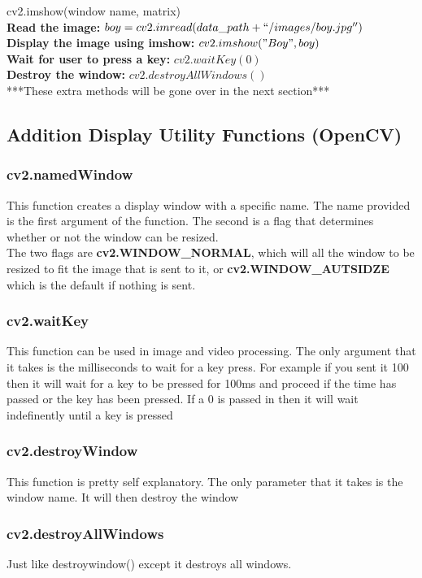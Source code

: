\documentclass[fleqn]{article}
\begin{document}
    \begin{center}
      cv2.imshow(window name, matrix)\\
      \textbf{Read the image:} $boy = cv2.imread(data\_path + ``/images/boy.jpg'')$\\
      \textbf{Display the image using imshow: } $cv2.imshow("Boy", boy)$\\
      \textbf{Wait for user to press a key: } $cv2.waitKey(0)$\\
      \textbf{Destroy the window: } $cv2.destroyAllWindows()$\\
      ***These extra methods will be gone over in the next section***
    \end{center}

    \subsection{Addition Display Utility Functions (OpenCV)}
    \subsubsection{cv2.namedWindow}
    This function creates a display window with a specific name. The name provided is the first argument of the function. The second is a flag that determines whether or not the window can be resized. \\
    The two flags are \textbf{cv2.WINDOW\_NORMAL}, which will all the window to be resized to fit the image that is sent to it, or \textbf{cv2.WINDOW\_AUTSIDZE} which is the default if nothing is sent.
    \subsubsection{cv2.waitKey}
    This function can be used in image and video processing. The only argument that it takes is the milliseconds to wait for a key press. For example if you sent it 100 then it will wait for a key to be pressed for 100ms and proceed if the time has passed or the key has been pressed. If a 0 is passed in then it will wait indefinently until a key is pressed
    \subsubsection{cv2.destroyWindow}
    This function is pretty self explanatory. The only parameter that it takes is the window name. It will then destroy the window
    \subsubsection{cv2.destroyAllWindows}
    Just like destroywindow() except it destroys all windows.
\end{document}
